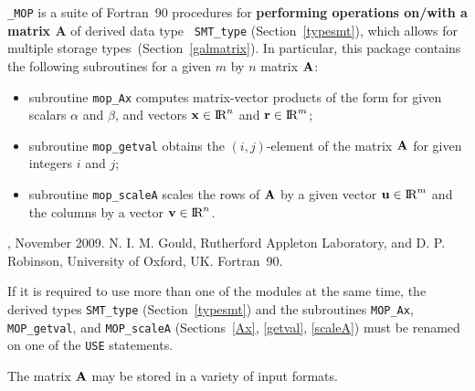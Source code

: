 \documentclass{galahad}
\newcommand{\packagename}{MOP}
\newcommand{\fullpackagename}{\libraryname\_\packagename}
\begin{document}
\galheader


\galsummary

{\tt \fullpackagename} is a suite of Fortran~90 procedures for
{\bf performing operations on/with a matrix $\mathbf{A}$} of derived data type {\tt
  SMT\_type} (Section~\ref{typesmt}), which allows for multiple storage
types~(Section~\ref{galmatrix}).  In particular, this package contains the following
subroutines for a given $m$ by $n$ matrix ${\mathbf{A}}$:
\begin{itemize}
  \item subroutine {\tt mop\_Ax} computes matrix-vector products of
    the form
    for given scalars $\alpha$ and $\beta$, and vectors ${\mathbf{x}}
    \in \hbox{I\hskip -1.5pt R}^n$ and ${\mathbf{r}} \in \hbox{I\hskip -1.5pt R}^m$;
  \item subroutine {\tt mop\_getval} obtains the $(i,j)$-element of
    the matrix ${\mathbf{A}}$ for given integers $i$ and $j$;
  \item subroutine {\tt mop\_scaleA} scales the rows of ${\mathbf{A}}$ by a
    given vector ${\mathbf{u}}\in\hbox{I\hskip -1.5pt R}^m$ and the columns by a vector ${\mathbf{v}}\in\hbox{I\hskip -1.5pt R}^n$.
\end{itemize}


\galattributes
\galversions{\tt  \fullpackagename\_single, \fullpackagename\_double},
\galdate November 2009.
\galorigin N. I. M. Gould, Rutherford Appleton Laboratory, and
D. P. Robinson, University of Oxford, UK.
\gallanguage Fortran~90. 


\galhowto



\noindent
If it is required to use more than one of the modules at the same time, 
the derived types
{\tt SMT\_type} (Section~\ref{typesmt}) 
and the subroutines 
{\tt \packagename\_Ax}, {\tt \packagename\_getval}, and 
{\tt \packagename\_scaleA} (Sections~\ref{Ax}, \ref{getval},
\ref{scaleA}) must be renamed on one of the {\tt USE} statements.


\galmatrix

The matrix ${\mathbf{A}}$ may be stored in a variety of input formats.
\end{document}
